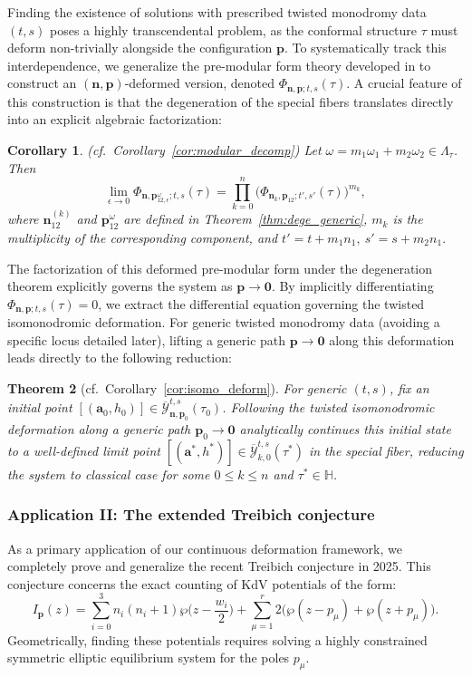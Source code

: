 \documentclass[11pt]{amsart}
\newtheorem{theorem}{Theorem}[section]
\newtheorem{corollary}[theorem]{Corollary}
\theoremstyle{remark}
\numberwithin{equation}{section}
\begin{document}
Finding the existence of solutions with prescribed twisted monodromy data $(t,s)$ poses a highly transcendental problem, as the conformal structure $\tau$ must deform non-trivially alongside the configuration $\mathbf{p}$. To systematically track this interdependence, we generalize the pre-modular form theory developed in \cite{Lin_Wang_2017} to construct an $(\mathbf{n}, \mathbf{p})$-deformed version, denoted $\Phi_{\mathbf{n},\mathbf{p};t,s}(\tau)$. A crucial feature of this construction is that the degeneration of the special fibers translates directly into an explicit algebraic factorization:
\begin{corollary}(cf.~Corollary~\ref{cor:modular_decomp})
Let $\omega = m_1\omega_1 + m_2 \omega_2 \in \Lambda_\tau$. Then$$    \lim_{\epsilon \rightarrow 0} \Phi_{\mathbf{n},\mathbf{p}_{12, \epsilon}^\omega;t,s}(\tau) = \prod_{k=0}^{n} \Big( \Phi_{\mathbf{n}_k,\mathbf{p}_{12};t',s'}(\tau) \Big)^{m_k},$$where $\mathbf{n}_{12}^{(k)}$ and $\mathbf{p}_{12}^{\omega}$ are defined in Theorem~\ref{thm:dege_generic}, $m_k$ is the multiplicity of the corresponding component, and $t' = t + m_1 n_1, \ s'= s + m_2 n_1.$\end{corollary}


The factorization of this deformed pre-modular form under the degeneration theorem explicitly governs the system as $\mathbf{p} \to \mathbf{0}$. By implicitly differentiating $\Phi_{\mathbf{n},\mathbf{p};t,s}(\tau) = 0$, we extract the differential equation governing the twisted isomonodromic deformation. For generic twisted monodromy data (avoiding a specific locus detailed later), lifting a generic path $\mathbf{p} \to \mathbf{0}$ along this deformation leads directly to the following reduction:
\begin{theorem}[cf.~Corollary~\ref{cor:isomo_deform}]
For generic $(t,s)$, fix an initial point $[(\mathbf{a}_0, h_0)] \in \overline{\mathcal{Y}}^{t,s}_{\mathbf{n}, \mathbf{p}_0}(\tau_0)$. Following the twisted isomonodromic deformation along a generic path $\mathbf{p}_0 \to \mathbf{0}$ analytically continues this initial state to a well-defined limit point $[(\mathbf{a}^*, h^*)] \in \overline{\mathcal{Y}}^{t,s}_{k,0}(\tau^*)$ in the special fiber, reducing the system to classical case for some $0 \leq k \leq n$ and $\tau^* \in \mathbb{H}$.
\end{theorem}
\subsubsection{Application II: The extended Treibich conjecture}
As a primary application of our continuous deformation framework, we completely prove and generalize the recent Treibich conjecture \cite{Treibich_2025} in 2025. This conjecture concerns the exact counting of KdV potentials of the form:
\begin{equation}
I_{\mathbf{p}}(z) = \sum_{i=0}^3 n_i(n_i+1)\wp\Big(z - \frac{w_i}{2}\Big) + \sum_{\mu=1}^r 2\Big(\wp(z-p_\mu)+\wp(z+p_\mu)\Big).
\end{equation}
Geometrically, finding these potentials requires solving a highly constrained symmetric elliptic equilibrium system for the poles $p_\mu$. 
\end{document}
